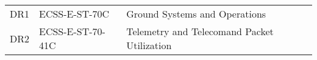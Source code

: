 
\begin{tabular}{p{}p{}p{}}
    DR1 & ECSS-E-ST-70C & Ground Systems and Operations\\
    DR2 & ECSS-E-ST-70-41C & Telemetry and Telecomand Packet Utilization\\
\end{tabular}